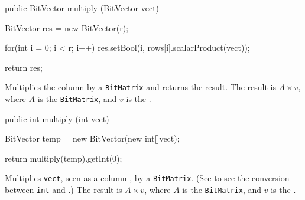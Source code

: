 \begin{htmlonly}
\end{htmlonly}
\begin{code}

   public BitVector multiply (BitVector vect) \begin{hide} {
      BitVector res = new BitVector(r);

      for(int i = 0; i < r; i++)
         res.setBool(i, rows[i].scalarProduct(vect));

      return res;
   } \end{hide}
\end{code}
\begin{tabb} Multiplies the column  by a \texttt{BitMatrix}
  and returns the result. The result is $A \times v$, where $A$ is the
  \texttt{BitMatrix}, and $v$ is the .
\end{tabb}
\begin{htmlonly}
\end{htmlonly}
\begin{code}

   public int multiply (int vect) \begin{hide} {
      BitVector temp = new BitVector(new int[]{vect});

      return multiply(temp).getInt(0);
   } \end{hide}
\end{code}
\begin{tabb} Multiplies \texttt{vect}, seen as a column , by
  a \texttt{BitMatrix}. (See  to see the conversion between
  \texttt{int} and .) The result is $A \times v$,
  where $A$ is the \texttt{BitMatrix}, and $v$ is the .
\end{tabb}
\begin{htmlonly}
\end{htmlonly}
